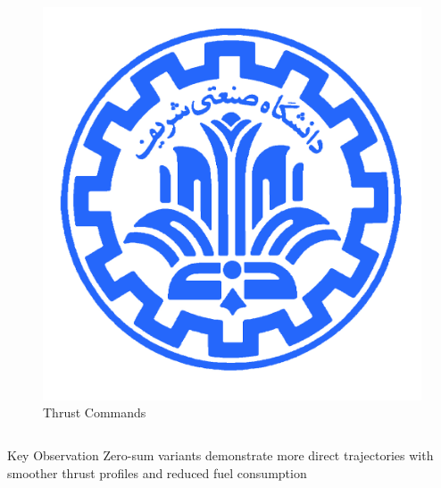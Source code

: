 \documentclass[
    11pt, %
    aspectratio=169, %
]{beamer}
\begin{document}
\begin{frame}
\begin{columns}[t]
\begin{column}{0.5\textwidth}
\begin{figure}
				\includegraphics[width=\textwidth]{td3_thrust_comparison.png}
				\caption{Thrust Commands}
			\end{figure}
		\end{column}
	\end{columns}
	
	\begin{alertblock}{Key Observation}
		Zero-sum variants demonstrate more direct trajectories with smoother thrust profiles and reduced fuel consumption
	\end{alertblock}
\end{frame}
\end{document}

